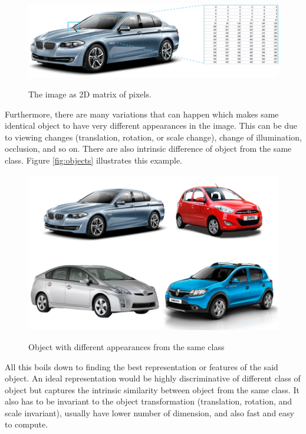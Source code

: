 \documentclass[a4paper,11pt]{kth-mag}
\begin{document}
\begin{figure}[h]
\centering
\includegraphics[scale=0.5]{image/car.png}
\label{fig:car}
\caption{The image as 2D matrix of pixels.}
\end{figure}

Furthermore, there are many variations that can happen which makes same identical object to have very different appearances in the image. This can be due to viewing changes (translation, rotation, or scale change), change of illumination, occlusion, and so on. There are also intrinsic difference of object from the same class. Figure \ref{fig:objects} illustrates this example.

\begin{figure}[h]
\centering
\includegraphics[scale=0.5]{image/cars.png}
\label{fig:cars}
\caption{Object with different appearances from the same class}
\end{figure}

All this boils down to finding the best representation or features of the said object. An ideal representation would be highly discriminative of different class of object but captures the intrinsic similarity between object from the same class. It also has to be invariant to the object transformation (translation, rotation, and scale invariant), usually have lower number of dimension, and also fast and easy to compute.
\end{document}
